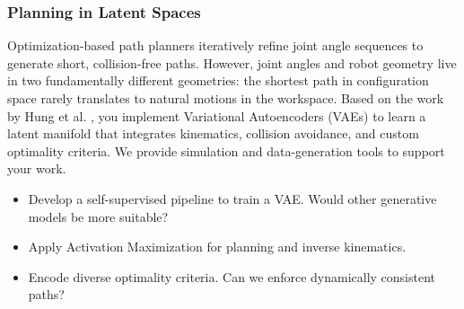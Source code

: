 \documentclass[a4paper]{article}
\begin{document}
\subsubsection{Planning in Latent Spaces}
Optimization-based path planners iteratively refine joint angle sequences to generate short, collision-free paths. However, joint angles and robot geometry live in two fundamentally different geometries: the shortest path in configuration space rarely translates to natural motions in the workspace.
Based on the work by Hung et al. \cite{Hung2022reaching}, you implement Variational Autoencoders (VAEs) to learn a latent manifold that integrates kinematics, collision avoidance, and custom optimality criteria. We provide simulation and data-generation tools to support your work.
\begin{itemize}
    \item Develop a self-supervised pipeline to train a VAE. Would other generative models be more suitable?
    \item Apply Activation Maximization for planning and inverse kinematics.
    \item Encode diverse optimality criteria. Can we enforce dynamically consistent paths?
\end{itemize}


\end{document}
